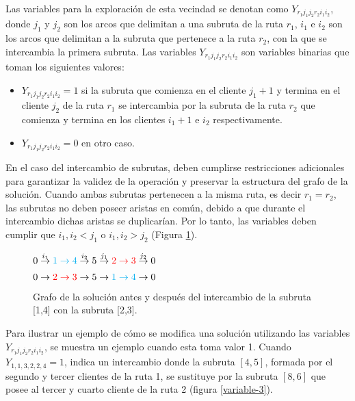\documentclass[12pt]{report}
\begin{document}
	Las variables para la exploración de esta vecindad se denotan como $Y_{r_1j_1j_2r_2i_1i_2}$, donde $j_1$ y $j_2$ son los arcos que delimitan a una subruta de la ruta $r_1$, $i_1$ e $i_2$ son los arcos que delimitan a la subruta que pertenece a la ruta $r_2$, con la que se intercambia la primera subruta. Las variables $Y_{r_1j_1j_2r_2i_1i_2}$ son variables binarias que toman los siguientes valores:
	\begin{itemize}
		\item $Y_{r_1 j_1 j_2 r_2 i_1 i_2} = 1$ si la subruta que comienza en el cliente $j_1+1$ y termina en el cliente $j_2$ de la ruta $r_1$ se intercambia por la subruta de la ruta $r_2$ que comienza y termina en los clientes $i_1+1$ e $i_2$ respectivamente.
		\item $Y_{r_1 j_1 j_2 r_2 i_1 i_2} = 0$ en otro caso.
	\end{itemize}

	En el caso del intercambio de subrutas, deben cumplirse restricciones adicionales para garantizar la validez de la operación y preservar la estructura del grafo de la solución. Cuando ambas subrutas pertenecen a la misma ruta, es decir $r_1 = r_2$, las subrutas no deben poseer aristas en común, debido a que durante el intercambio dichas aristas se duplicarían. Por lo tanto, las variables deben cumplir que $i_1,i_2 < j_1$ o $i_1,i_2 > j_2$ (Figura \ref{fig:grafo-efecto}).

	\begin{figure}[h!]
		\begin{minipage}{0.45\textwidth}
			\centering
			$ 0 \overset{i_1}{\rightarrow} \textcolor{cyan}{1 \rightarrow 4} \overset{i_2}{\rightarrow} 5 \overset{j_1}{\rightarrow} \textcolor{red}{2 \rightarrow 3} \overset{j_2}{\rightarrow} 0$\\
		\end{minipage}
		\hfill
		\begin{minipage}{0.45\textwidth}
			\centering
			$0 \rightarrow \textcolor{red}{2 \rightarrow 3} \rightarrow 5 \rightarrow\textcolor{cyan}{1 \rightarrow 4} \rightarrow 0$
		\end{minipage}
		\caption{Grafo de la solución antes y después del intercambio de la subruta [1,4] con la subruta [2,3].}
		\label{fig:grafo-efecto}
	\end{figure}

	Para ilustrar un ejemplo de cómo se modifica una solución utilizando las variables $Y_{r_1 j_1 j_2 r_2 i_1 i_2}$, se muestra un ejemplo cuando esta toma valor 1. Cuando $Y_{1,1,3,2,2,4}=1$, indica un intercambio donde la subruta \([4,5]\), formada por el segundo y tercer clientes de la ruta 1, se sustituye por la subruta \([8,6]\) que posee al tercer y cuarto cliente de la ruta 2 (figura \ref{variable-3}).
\end{document}
